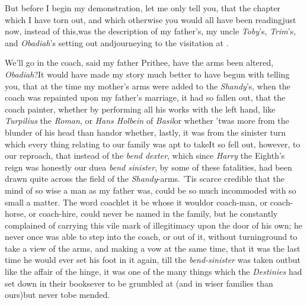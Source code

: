 \documentclass[twoside]{article}
\begin{document}
But before I begin my demonstration, let me only tell you,
that the chapter which I have torn out, and which otherwise
you would all have been reading\break just now, instead of
this,\tsk was the description of my father’s, my uncle
\textit{Toby}’s, \textit{Trim}’s, and \textit{Obadiah}’s
setting out and\break journeying to the visitation at
\hbox{\astiv}.

We’ll go in the coach, said my father\break
\tsk Prithee, have the arms been altered,
\textit{Obadiah}?\tsk It would have made my story much
better to have begun with telling you, that at the time my
mother’s arms were added to the \textit{Shandy}’s, when the
coach was repainted upon my father’s marriage, it had so
fallen out, that the coach painter, whether by performing all
his works with the left hand, like\break
\textit{Turpilius} the
\textit{Roman}, or \textit{Hans Holbein} of
\textit{Basil}\tsk or whether ’twas more from the blunder of
his head than hand\tsk or whe\-ther, lastly, it was from the
sinister turn which every thing relating to our family was
apt to take\tsk It so fell out, however, to our reproach,
that instead of the \textit{bend dexter}, which since
\textit{Harry} the Eighth’s reign was honestly our due\tsk a
\textit{bend sinister}, by some of these fatalities, had
been drawn quite across the field of the \textit{Shandy}-arms. 
’Tis scarce credible that the mind of so wise a man as
my father was, could be so much incommoded with so small a
matter. The word coach\tsk let it be whose it would\tsk or
coach-man, or coach-horse, or coach-hire, could never be
named in the family, but he constantly complained of
carrying this vile mark of illegitimacy upon the door of his
own; he never once was able to step into the coach, or out
of it, without turning\break round to take a view of the arms, and
making a vow at the same time, that it was the last time he
would ever set his foot in it again, till the
\textit{bend-sinister} was taken out\tsk but like the affair
of the hinge, it was one of the many things which the
\textit{Destinies} had set down in their books\tsk ever to be
grumbled at (and in wiser families than ours)\tsk but never
to\break be mended.
\end{document}
